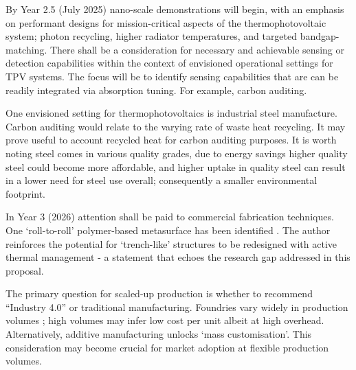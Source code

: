 By Year 2.5 (July 2025) nano-scale demonstrations will begin, with an emphasis on performant designs for mission-critical aspects of the thermophotovoltaic system; photon recycling, higher radiator temperatures, and targeted bandgap-matching. There shall be a consideration for necessary and achievable sensing or detection capabilities within the context of envisioned operational settings for TPV systems. The focus will be to identify sensing capabilities that are can be readily integrated via absorption tuning. For example, carbon auditing. 

One envisioned setting for thermophotovoltaics is industrial steel manufacture. Carbon auditing would relate to the varying rate of waste heat recycling. It may prove useful to account recycled heat for carbon auditing purposes. It is worth noting steel comes in various quality grades, due to energy savings higher quality steel could become more affordable, and higher uptake in quality steel can result in a lower need for steel use overall; consequently a smaller environmental footprint.


In Year 3 (2026) attention shall be paid to commercial fabrication techniques. One ‘roll-to-roll’ polymer-based metasurface has been identified \cite{Ma2023}. The author reinforces the potential for ‘trench-like’ structures to be redesigned with active thermal management - a statement that echoes the research gap addressed in this proposal.

The primary question for scaled-up production is whether to recommend “Industry 4.0” or traditional manufacturing. Foundries vary widely in production volumes \cite{wiki:memsfoundries}; high volumes may infer low cost per unit albeit at high overhead. Alternatively, additive manufacturing unlocks ‘mass customisation’. This consideration may become crucial for market adoption at flexible production volumes.

